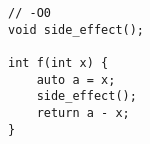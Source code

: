\begin{lstlisting}[title=\href{https://godbolt.org/z/qVPDHt}{\texttt{godbolt.org/z/qVPDHt}}]
// -O0
void side_effect();

int f(int x) {
    auto a = x;
    side_effect();
    return a - x;
}
\end{lstlisting}
